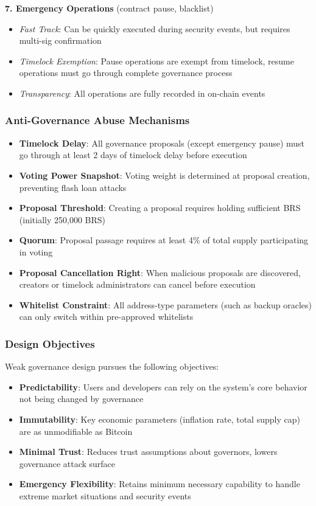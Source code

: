 \documentclass{article}
\begin{document}
\textbf{7. Emergency Operations} (contract pause, blacklist)
\begin{itemize}
  \item \textit{Fast Track}: Can be quickly executed during security events, but requires multi-sig confirmation
  \item \textit{Timelock Exemption}: Pause operations are exempt from timelock, resume operations must go through complete governance process
  \item \textit{Transparency}: All operations are fully recorded in on-chain events
\end{itemize}

\subsubsection{Anti-Governance Abuse Mechanisms}
\begin{itemize}
  \item \textbf{Timelock Delay}: All governance proposals (except emergency pause) must go through at least 2 days of timelock delay before execution
  \item \textbf{Voting Power Snapshot}: Voting weight is determined at proposal creation, preventing flash loan attacks
  \item \textbf{Proposal Threshold}: Creating a proposal requires holding sufficient BRS (initially 250,000 BRS)
  \item \textbf{Quorum}: Proposal passage requires at least 4\% of total supply participating in voting
  \item \textbf{Proposal Cancellation Right}: When malicious proposals are discovered, creators or timelock administrators can cancel before execution
  \item \textbf{Whitelist Constraint}: All address-type parameters (such as backup oracles) can only switch within pre-approved whitelists
\end{itemize}

\subsubsection{Design Objectives}
Weak governance design pursues the following objectives:
\begin{itemize}
  \item \textbf{Predictability}: Users and developers can rely on the system's core behavior not being changed by governance
  \item \textbf{Immutability}: Key economic parameters (inflation rate, total supply cap) are as unmodifiable as Bitcoin
  \item \textbf{Minimal Trust}: Reduces trust assumptions about governors, lowers governance attack surface
  \item \textbf{Emergency Flexibility}: Retains minimum necessary capability to handle extreme market situations and security events
\end{itemize}
\end{document}
